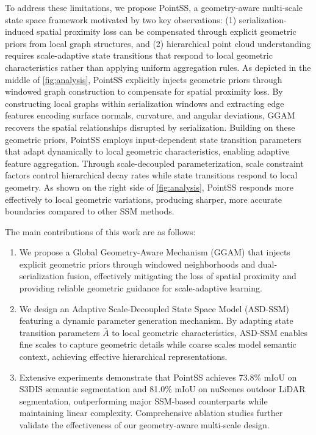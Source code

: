 \documentclass[a4paper,fleqn]{cas-sc}
\begin{document}
To address these limitations, we propose PointSS, a geometry-aware multi-scale state space framework motivated by two key observations: (1) serialization-induced spatial proximity loss can be compensated through explicit geometric priors from local graph structures, and (2) hierarchical point cloud understanding requires scale-adaptive state transitions that respond to local geometric characteristics rather than applying uniform aggregation rules. As depicted in the middle of \cref{fig:analysis}, PointSS explicitly injects geometric priors through windowed graph construction to compensate for spatial proximity loss. By constructing local graphs within serialization windows and extracting edge features encoding surface normals, curvature, and angular deviations, GGAM recovers the spatial relationships disrupted by serialization. Building on these geometric priors, PointSS employs input-dependent state transition parameters that adapt dynamically to local geometric characteristics, enabling adaptive feature aggregation. Through scale-decoupled parameterization, scale constraint factors control hierarchical decay rates while state transitions respond to local geometry. As shown on the right side of \cref{fig:analysis}, PointSS responds more effectively to local geometric variations, producing sharper, more accurate boundaries compared to other SSM methods.

The main contributions of this work are as follows:

\begin{enumerate}
	\item We propose a Global Geometry-Aware Mechanism (GGAM) that injects
	explicit geometric priors through windowed neighborhoods and dual-
	serialization fusion, effectively mitigating the loss of spatial proximity
	and providing reliable geometric guidance for scale-adaptive learning.
	
	\item We design an Adaptive Scale-Decoupled State Space Model (ASD-SSM)
	featuring a dynamic parameter generation mechanism. By adapting state
	transition parameters $\bar{A}$ to local geometric characteristics, ASD-SSM
	enables fine scales to capture geometric details while coarse scales model
	semantic context, achieving effective hierarchical representations.
	
	\item Extensive experiments demonstrate that PointSS achieves 73.8\% mIoU
	on S3DIS semantic segmentation and 81.0\% mIoU on nuScenes outdoor LiDAR segmentation,
	outperforming major SSM-based counterparts while maintaining linear complexity.
	Comprehensive ablation studies further validate the effectiveness of our
	geometry-aware multi-scale design.
\end{enumerate}
\end{document}
